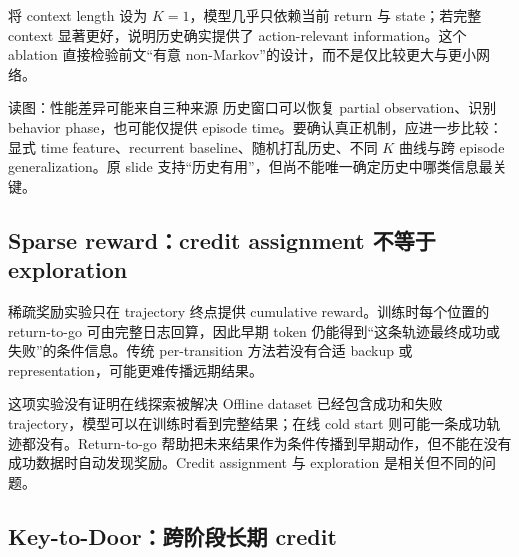 将 context length 设为 $K=1$，模型几乎只依赖当前 return 与 state；若完整 context 显著更好，说明历史确实提供了 action-relevant information。这个 ablation 直接检验前文“有意 non-Markov”的设计，而不是仅比较更大与更小网络。


\begin{knowledgebox}{读图：性能差异可能来自三种来源}
历史窗口可以恢复 partial observation、识别 behavior phase，也可能仅提供 episode time。要确认真正机制，应进一步比较：显式 time feature、recurrent baseline、随机打乱历史、不同 $K$ 曲线与跨 episode generalization。原 slide 支持“历史有用”，但尚不能唯一确定历史中哪类信息最关键。
\end{knowledgebox}

\subsection{Sparse reward：credit assignment 不等于 exploration}

稀疏奖励实验只在 trajectory 终点提供 cumulative reward。训练时每个位置的 return-to-go 可由完整日志回算，因此早期 token 仍能得到“这条轨迹最终成功或失败”的条件信息。传统 per-transition 方法若没有合适 backup 或 representation，可能更难传播远期结果。


\begin{warningbox}{这项实验没有证明在线探索被解决}
Offline dataset 已经包含成功和失败 trajectory，模型可以在训练时看到完整结果；在线 cold start 则可能一条成功轨迹都没有。Return-to-go 帮助把未来结果作为条件传播到早期动作，但不能在没有成功数据时自动发现奖励。Credit assignment 与 exploration 是相关但不同的问题。
\end{warningbox}


\subsection{Key-to-Door：跨阶段长期 credit}

